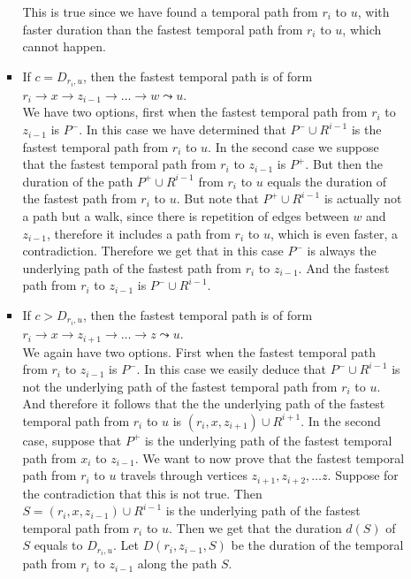 \documentclass[11pt,a4paper]{article}
\theoremstyle{remark}
\theoremstyle{definition}
\begin{document}
\begin{enumerate}[(i)]
\begin{enumerate}[(a)]
\begin{itemize}
            This is true since we have found a temporal path from $r_i$ to $u$, with faster duration than the fastest temporal path from $r_i$ to $u$,
            which cannot happen.
            \item  If $c = D_{r_i,u}$, then 
            the fastest temporal path is of form $r_i \rightarrow x \rightarrow z_{i-1} \rightarrow \dots \rightarrow w \leadsto u$.\\
            We have two options, first when the fastest temporal path from $r_i$ to $z_{i-1}$ is $P^-$.
            In this case we have determined that $P^- \cup R^{i-1}$ is the fastest temporal path from $r_i$ to $u$.
            In the second case we suppose that the fastest temporal path from $r_i$ to $z_{i-1}$ is $P^+$.
            But then the duration of the path $P^+ \cup R^{i-1}$ from $r_i$ to $u$ equals the duration of the fastest path from $r_i$ to $u$. But note that $P^+ \cup R^{i-1}$ is actually not a path but a walk, since there is repetition of edges between $w$ and $z_{i-1}$,
            therefore it includes a path from $r_i$ to $u$, which is even faster,
            a contradiction.
            Therefore we get that in this case $P^-$ is always the underlying path of the fastest path from $r_i$ to $z_{i-1}$.
            And the fastest path from $r_i$ to $z_{i-1}$ is $P^- \cup R^{i-1}$.
            \item If $c > D_{r_i,u}$, then 
            the fastest temporal path is of form $r_i \rightarrow x \rightarrow z_{i+1} \rightarrow \dots \rightarrow z \leadsto u$.\\
            We again have two options.
            First when the fastest temporal path from $r_i$ to $z_{i-1}$ is $P^-$.
            In this case we easily deduce that $P^- \cup R^{i-1}$ is not the underlying path of the fastest temporal path from $r_i$ to $u$.
            And therefore it follows that the the underlying path of the fastest temporal path from $r_i$ to $u$ is  $(r_i, x, z_{i+1}) \cup R^{i+1}$.
            In the second case, suppose that $P^+$ is the underlying path of the fastest temporal path from $x_i$ to $z_{i-1}$.
            We want to now prove that the fastest temporal path from $r_i$ to $u$ travels through vertices $z_{i+1}, z_{i+2}, \dots z$.
            Suppose for the contradiction that this is not true. 
            Then $S = (r_i, x, z_{i-1}) \cup R^{i-1}$ is the underlying path of the fastest temporal path from $r_i$ to $u$.
            Then we get that the duration $d(S)$ of $S$ equals to $D_{r_i,u}$.
            Let $D(r_i,z_{i-1},S)$ be the duration of the temporal path from $r_i$ to $z_{i-1}$ along the path $S$.

\end{itemize}
\end{enumerate}
\end{enumerate}
\end{document}
